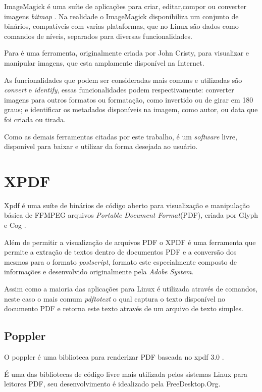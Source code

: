 ImageMagick é uma suíte de aplicações para criar, editar,compor ou converter imagens \textit{bitmap} \cite{IMAGEMAGICK-STUDIO}.
Na realidade o ImageMagick disponibiliza um conjunto de binários, compatíveis com varias plataformas, que no Linux são dados como comandos de níveis, separados para diversas funcionalidades.

Para  é uma ferramenta, originalmente criada por John Cristy, para visualizar e manipular imagens, que esta amplamente disponível na Internet.

As funcionalidades que podem ser consideradas mais comuns e utilizadas são \textit{convert} e \textit{identify}, essas funcionalidades podem respectivamente: converter imagens para outros formatos ou formatação, como invertido ou de girar em 180 graus; e identificar os metadados disponíveis na imagem, como autor, ou data que foi criada ou tirada.

Como as demais ferramentas citadas por este trabalho, é um \textit{software} livre, disponível para baixar e utilizar da forma desejada ao usuário.


\section{XPDF}

Xpdf é uma suíte de binários de código aberto para visualização e manipulação básica de FFMPEG arquivos \textit{Portable Document Format}(PDF), criada por Glyph e Cog \cite{GLYPH-COG}.

Além de permitir a visualização de arquivos PDF o XPDF é uma ferramenta que permite a extração de textos dentro de documentos PDF e a conversão dos mesmos para o formato \textit{postscript}, formato este especialmente composto de informações e desenvolvido originalmente pela \textit{Adobe System}.

Assim como a maioria das aplicações para Linux é utilizada através de comandos, neste caso o mais comum \textit{pdftotext} o qual captura o texto disponível no documento PDF e retorna este texto através de um arquivo de texto simples.


\subsection{Poppler}

O poppler é uma biblioteca para renderizar PDF baseada no xpdf 3.0 \cite{JOHNSON}.

É uma das bibliotecas de código livre mais utilizada pelos sistemas Linux para leitores PDF, seu desenvolvimento é idealizado pela FreeDesktop.Org.


